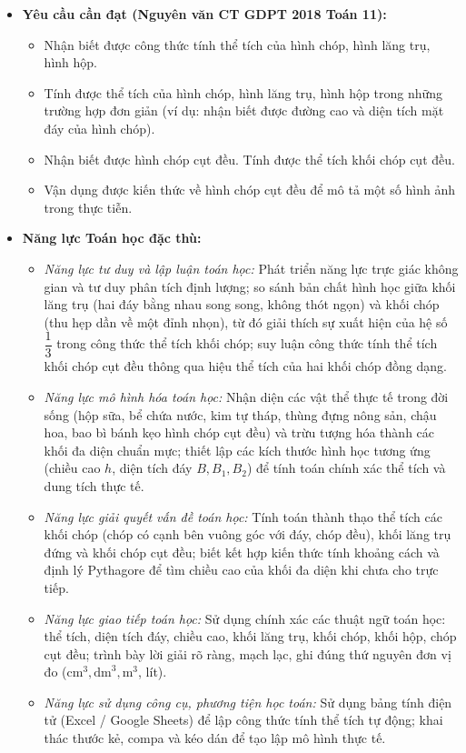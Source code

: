 \documentclass[12pt, a4paper]{article}
\begin{document}
\begin{itemize}[leftmargin=1.2cm]
    \item \textbf{Yêu cầu cần đạt (Nguyên văn CT GDPT 2018 Toán 11):}
    \begin{itemize}[leftmargin=0.6cm]
        \item Nhận biết được công thức tính thể tích của hình chóp, hình lăng trụ, hình hộp.
        \item Tính được thể tích của hình chóp, hình lăng trụ, hình hộp trong những trường hợp đơn giản (ví dụ: nhận biết được đường cao và diện tích mặt đáy của hình chóp).
        \item Nhận biết được hình chóp cụt đều. Tính được thể tích khối chóp cụt đều.
        \item Vận dụng được kiến thức về hình chóp cụt đều để mô tả một số hình ảnh trong thực tiễn.
    \end{itemize}

    \item \textbf{Năng lực Toán học đặc thù:}
    \begin{itemize}[leftmargin=0.6cm]
        \item \textit{Năng lực tư duy và lập luận toán học:} Phát triển năng lực trực giác không gian và tư duy phân tích định lượng; so sánh bản chất hình học giữa khối lăng trụ (hai đáy bằng nhau song song, không thót ngọn) và khối chóp (thu hẹp dần về một đỉnh nhọn), từ đó giải thích sự xuất hiện của hệ số $\dfrac{1}{3}$ trong công thức thể tích khối chóp; suy luận công thức tính thể tích khối chóp cụt đều thông qua hiệu thể tích của hai khối chóp đồng dạng.
        \item \textit{Năng lực mô hình hóa toán học:} Nhận diện các vật thể thực tế trong đời sống (hộp sữa, bể chứa nước, kim tự tháp, thùng đựng nông sản, chậu hoa, bao bì bánh kẹo hình chóp cụt đều) và trừu tượng hóa thành các khối đa diện chuẩn mực; thiết lập các kích thước hình học tương ứng (chiều cao $h$, diện tích đáy $B, B_1, B_2$) để tính toán chính xác thể tích và dung tích thực tế.
        \item \textit{Năng lực giải quyết vấn đề toán học:} Tính toán thành thạo thể tích các khối chóp (chóp có cạnh bên vuông góc với đáy, chóp đều), khối lăng trụ đứng và khối chóp cụt đều; biết kết hợp kiến thức tính khoảng cách và định lý Pythagore để tìm chiều cao của khối đa diện khi chưa cho trực tiếp.
        \item \textit{Năng lực giao tiếp toán học:} Sử dụng chính xác các thuật ngữ toán học: thể tích, diện tích đáy, chiều cao, khối lăng trụ, khối chóp, khối hộp, chóp cụt đều; trình bày lời giải rõ ràng, mạch lạc, ghi đúng thứ nguyên đơn vị đo ($\text{cm}^3, \text{dm}^3, \text{m}^3$, lít).
        \item \textit{Năng lực sử dụng công cụ, phương tiện học toán:} Sử dụng bảng tính điện tử (Excel / Google Sheets) để lập công thức tính thể tích tự động; khai thác thước kẻ, compa và kéo dán để tạo lập mô hình thực tế.
    \end{itemize}


\end{itemize}
\end{document}
